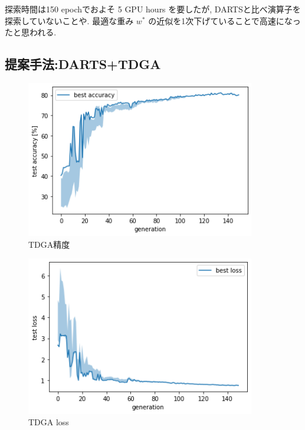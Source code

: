 探索時間は150 epochでおよそ 5 GPU hours を要したが, DARTSと比べ演算子を探索していないことや.
最適な重み $w^*$ の近似を1次下げていることで高速になったと思われる.




\changeindent{0cm}
\subsection{提案手法:DARTS+TDGA}
\label{sec:exp.02}
\changeindent{2cm}


\begin{figure}[t]
  \begin{center}
    \includegraphics[clip,width=10cm]{./fig/04.exp/acc_tdga.png}
  \end{center}
  \caption{TDGA精度}
  \label{fig:acc_tdga}
\end{figure}

\begin{figure}[t]
  \begin{center}
    \includegraphics[clip,width=10cm]{./fig/04.exp/loss_tdga.png}
  \end{center}
  \caption{TDGA loss}
  \label{fig:loss_tdga}
\end{figure}

